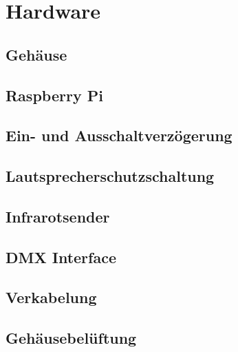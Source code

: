 \hypertarget{hardware}{%
\section{Hardware}\label{hardware}}

\hypertarget{gehuxe4use}{%
\subsection{Gehäuse}\label{gehuxe4use}}

\hypertarget{raspberry-pi}{%
\subsection{Raspberry Pi}\label{raspberry-pi}}

\hypertarget{ein--und-ausschaltverzuxf6gerung}{%
\subsection{Ein- und
Ausschaltverzögerung}\label{ein--und-ausschaltverzuxf6gerung}}

\hypertarget{lautsprecherschutzschaltung}{%
\subsection{Lautsprecherschutzschaltung}\label{lautsprecherschutzschaltung}}

\hypertarget{infrarotsender}{%
\subsection{Infrarotsender}\label{infrarotsender}}

\hypertarget{dmx-interface}{%
\subsection{DMX Interface}\label{dmx-interface}}

\hypertarget{verkabelung}{%
\subsection{Verkabelung}\label{verkabelung}}

\hypertarget{gehuxe4usebeluxfcftung}{%
\subsection{Gehäusebelüftung}\label{gehuxe4usebeluxfcftung}}

